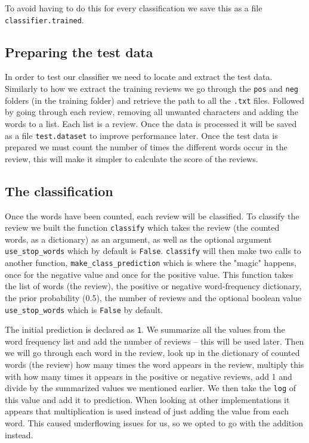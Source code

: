 \documentclass[a4paper,12pt]{article}
\begin{document}
To avoid having to do this for every classification we save this as a file \texttt{classifier.trained}.

\subsection{Preparing the test data}
In order to test our classifier we need to locate and extract the test data. Similarly to how we extract the training reviews we go through the \texttt{pos} and \texttt{neg} folders (in the training folder) and retrieve the path to all the \texttt{.txt} files. Followed by going through each review, removing all unwanted characters and adding the words to a list. Each list is a review. Once the data is processed it will be saved as a file \texttt{test.dataset} to improve performance later. Once the test data is prepared we must count the number of times the different words occur in the review, this will make it simpler to calculate the score of the reviews.

\subsection{The classification}
 Once the words have been counted, each review will be classified. To classify the review we built the function \texttt{classify} which takes the review (the counted words, as a dictionary) as an argument, as well as the optional argument \texttt{use\_stop\_words} which by default is \texttt{False}. \texttt{classify} will then make two calls to another function, \texttt{make\_class\_prediction} which is where the "magic" happens, once for the negative value and once for the positive value. This function takes the list of words (the review), the positive or negative word-frequency dictionary, the prior probability (0.5), the number of reviews and the optional boolean value \texttt{use\_stop\_words} which is \texttt{False} by default.
 
 The initial prediction is declared as \texttt{1}. We summarize all the values from the word frequency list and add the number of reviews -- this will be used later. Then we will go through each word in the review, look up in the dictionary of counted words (the review) how many times the word appears in the review, multiply this with how many times it appears in the positive or negative reviews, add 1 and divide by the summarized values we mentioned earlier. We then take the \texttt{log} of this value and add it to prediction.
 When looking at other implementations it appears that multiplication is used instead of just adding the value from each word. This caused underflowing issues for us, so we opted to go with the addition instead.
 
\end{document}
